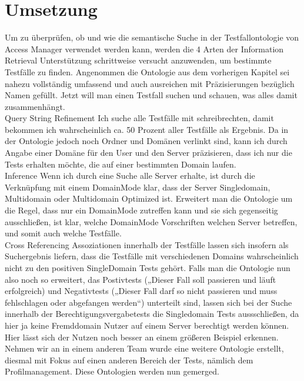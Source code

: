 \section{Umsetzung}
Um zu überprüfen, ob und wie die semantische Suche in der Testfallontologie von Access Manager verwendet werden kann, werden die 4 Arten der Information Retrieval Unterstützung schrittweise versucht anzuwenden, um bestimmte Testfälle zu finden.
Angenommen die Ontologie aus dem vorherigen Kapitel sei nahezu vollständig umfassend und auch ausreichen mit Präzisierungen bezüglich Namen gefüllt. Jetzt will man einen Testfall suchen und schauen, was alles damit zusammenhängt.\\

Query String Refinement\newline
Ich suche alle Testfälle mit schreibrechten, damit bekommen ich wahrscheinlich ca. 50 Prozent aller Testfälle als Ergebnis. Da in der Ontologie jedoch noch Ordner und Domänen verlinkt sind, kann ich durch Angabe einer Domäne für den User und den Server präzisieren, dass ich nur die Tests erhalten möchte, die auf einer bestimmten Domain laufen.\\

Inference\newline
Wenn ich durch eine Suche alle Server erhalte, ist durch die Verknüpfung mit einem DomainMode klar, dass der Server Singledomain, Multidomain oder Multidomain Optimized ist. Erweitert man die Ontologie um die Regel, dass nur ein DomainMode zutreffen kann und sie sich gegenseitig ausschließen, ist klar, welche DomainMode Vorschriften welchen Server betreffen, und somit auch welche Testfälle.\\

Cross Referencing \newline
Assoziationen innerhalb der Testfälle lassen sich insofern als Suchergebnis liefern, dass die Testfälle mit verschiedenen Domains wahrscheinlich nicht zu den positiven SingleDomain Tests gehört. Falls man die Ontologie nun also noch so erweitert, das Postivtests („Dieser Fall soll passieren und läuft erfolgreich) und Negativtests („Dieser Fall darf so nicht passieren und muss fehlschlagen oder abgefangen werden“) unterteilt sind, lassen sich bei der Suche innerhalb der Berechtigungsvergabetests die Singledomain Tests aussschließen, da hier ja keine Fremddomain Nutzer auf einem Server berechtigt werden können. \newline
Hier lässt sich der Nutzen noch besser an einem größeren Beispiel erkennen. Nehmen wir an in einem anderen Team wurde eine weitere Ontologie erstellt, diesmal mit Fokus auf einen anderen Bereich der Tests, nämlich dem Profilmanagement. Diese Ontologien werden nun gemerged.\\

